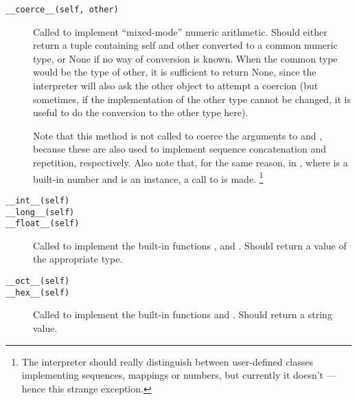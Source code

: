 \begin{description}
\item[{\tt __coerce__(self, other)}]
Called to implement ``mixed-mode'' numeric arithmetic.  Should either
return a tuple containing self and other converted to a common numeric
type, or None if no way of conversion is known.  When the common type
would be the type of other, it is sufficient to return None, since the
interpreter will also ask the other object to attempt a coercion (but
sometimes, if the implementation of the other type cannot be changed,
it is useful to do the conversion to the other type here).

Note that this method is not called to coerce the arguments to \code{+}
and \code{*}, because these are also used to implement sequence
concatenation and repetition, respectively.  Also note that, for the
same reason, in , where  is a built-in
number and  is an instance, a call to
 is made.%
\footnote{The interpreter should really distinguish between
user-defined classes implementing sequences, mappings or numbers, but
currently it doesn't --- hence this strange exception.}

\item[{\tt __int__(self)}]\itemjoin
\item[{\tt __long__(self)}]\itemjoin
\item[{\tt __float__(self)}]\itembreak
Called to implement the built-in functions , 
and .  Should return a value of the appropriate type.

\item[{\tt __oct__(self)}]\itemjoin
\item[{\tt __hex__(self)}]\itembreak
Called to implement the built-in functions  and
.  Should return a string value.

\end{description}
